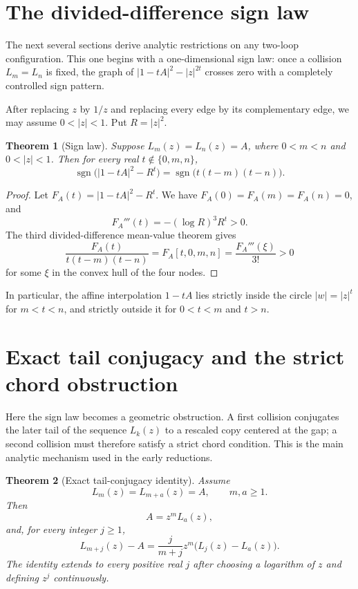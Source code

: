 \documentclass[11pt]{article}
\numberwithin{equation}{section}
\newtheorem{theorem}{Theorem}[section]
\theoremstyle{definition}
\begin{document}
\section{The divided-difference sign law}

The next several sections derive analytic restrictions on any two-loop configuration.  This one begins with a one-dimensional sign law: once a collision \(L_m=L_n\) is fixed, the graph of \(|1-tA|^2-|z|^{2t}\) crosses zero with a completely controlled sign pattern.

After replacing \(z\) by \(1/z\) and replacing every edge by its complementary
edge, we may assume \(0<|z|<1\).  Put \(R=|z|^2\).

\begin{theorem}[Sign law]\label{thm:sign}
Suppose \(L_m(z)=L_n(z)=A\), where \(0<m<n\) and \(0<|z|<1\).  Then for every
real \(t\notin\{0,m,n\}\),
\[
 \operatorname{sgn}\bigl(|1-tA|^2-R^t\bigr)
 =\operatorname{sgn}\bigl(t(t-m)(t-n)\bigr).
 \label{eq:5-1}
\]
\end{theorem}

\begin{proof}
Let \(F_A(t)=|1-tA|^2-R^t\).  We have
\(F_A(0)=F_A(m)=F_A(n)=0\), and
\[
 F_A'''(t)=-(\log R)^3R^t>0.
\]
The third divided-difference mean-value theorem gives
\[
 \frac{F_A(t)}{t(t-m)(t-n)}
 =F_A[t,0,m,n]=\frac{F_A'''(\xi)}{3!}>0
\]
for some \(\xi\) in the convex hull of the four nodes.
\end{proof}

In particular, the affine interpolation \(1-tA\) lies strictly inside the
circle \(|w|=|z|^t\) for \(m<t<n\), and strictly outside it for
\(0<t<m\) and \(t>n\).

\section{Exact tail conjugacy and the strict chord obstruction}
\label{sec:tail}

Here the sign law becomes a geometric obstruction.  A first collision conjugates the later tail of the sequence \(L_k(z)\) to a rescaled copy centered at the gap; a second collision must therefore satisfy a strict chord condition.  This is the main analytic mechanism used in the early reductions.

\begin{theorem}[Exact tail-conjugacy identity]\label{thm:tail}
Assume
\[
 L_m(z)=L_{m+a}(z)=A,
 \qquad m,a\geq1.
\]
Then
\begin{equation}
 A=z^mL_a(z),
 \label{eq:6-1}
\end{equation}
and, for every integer \(j\geq1\),
\begin{equation}
 L_{m+j}(z)-A
 =\frac{j}{m+j}z^m\bigl(L_j(z)-L_a(z)\bigr).
 \label{eq:6-2}
\end{equation}
The identity extends to every positive real \(j\) after choosing a logarithm
of \(z\) and defining \(z^j\) continuously.
\end{theorem}
\end{document}
